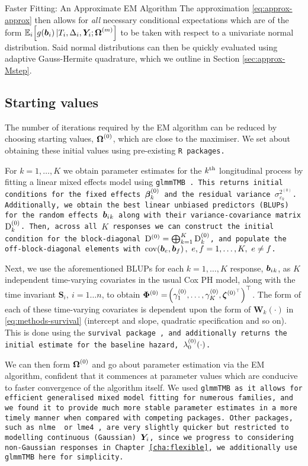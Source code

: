 \begin{chapter}{\label{cha:approx}Faster Fitting: An Approximate EM Algorithm}
  The approximation \eqref{eq:approx-approx} then allows for \textit{all} necessary conditional expectations which are of the form $\mathbb{E}_i\!\left[ g\!\left(\bm{b}_i\right)|T_i, \Delta_i, \bm{Y}_i; \bm{\mathrm{\Omega}}^{(m)}\right]$ to be taken with respect to a univariate normal distribution. Said normal distributions can then be quickly evaluated using adaptive Gauss-Hermite quadrature, which we outline in Section \ref{sec:approx-Mstep}. 

  \subsection{Starting values}\label{sec:approx-startvalues}
  The number of iterations required by the EM algorithm can be reduced by choosing starting values, $\bm{\mathrm{\Omega}}^{(0)}$, which are close to the maximiser. We set about obtaining these initial values using pre-existing \tt{R} packages.
  
  For $k=1,\dots,K$ we obtain parameter estimates for the $k^{\text{th}}$ longitudinal process by fitting a linear mixed effects model using \tt{glmmTMB} \citep{R-glmmTMB}. This returns initial conditions for the fixed effects $\bm{\beta}_k^{(0)}$ and the residual variance $\sigma_{\varepsilon_k}^{2^{(0)}}$. Additionally, we obtain the best linear unbiased predictors (BLUPs) for the random effects $\bm{b}_i{_k}$ along with their variance-covariance matrix $\mathrm{D}_k^{(0)}$. Then, across all $K$ responses we can construct the initial condition for the block-diagonal $\mathrm{D}^{(0)}=\bigoplus_{k=1}^K\mathrm{D}_k^{(0)}$, and populate the off-block-diagonal elements with $\mathrm{cov}\lb\bm{b}_e,\bm{b}_f\rb,\ e,f=1,\dots,K,\ e\neq f$.

  Next, we use the aforementioned BLUPs for each $k=1,\dots,K$ response, $\bm{b}_i{_k}$, as $K$ independent time-varying covariates in the usual Cox PH model, along with the time invariant $\bm{S}_i,\ i=1\dots n$, to obtain $\bm{\Phi}^{(0)}=\!\left(\gamma_1^{(0)},\dots,\gamma_K^{(0)},\bm{\zeta}^{(0)^{\top}}\right)^\top$. The form of each of these time-varying covariates is dependent upon the form of $\bm{W}_k(\cdot)$ in \eqref{eq:methods-survival} (\ie intercept and slope, quadratic specification and so on). This is done using the \tt{survival} package \citep{R-survival}, and additionally returns the initial estimate for the baseline hazard, $\lambda_0^{(0)}\!\left(\cdot\right)$.

  We can then form $\bm{\mathrm{\Omega}}^{(0)}$ and go about parameter estimation via the EM algorithm, confident that it commences at parameter values which are conducive to faster convergence of the algorithm itself. We used \tt{glmmTMB} as it allows for efficient generalised mixed model fitting for numerous families, and we found it to provide much more stable parameter estimates in a more timely manner when compared with competing packages. Other packages, such as \tt{nlme} \citep{R-nlme} or \tt{lme4} \citep{R-lme4}, are very slightly quicker but restricted to modelling continuous (Gaussian) $\bm{Y}_i$, since we progress to considering non-Gaussian responses in Chapter \ref{cha:flexible}, we additionally use \tt{glmmTMB} here for simplicity. 
  

\end{chapter}
